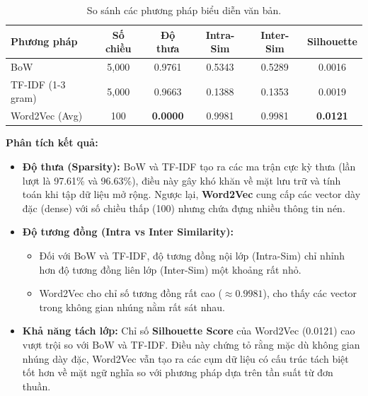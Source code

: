 \documentclass[12pt,a4paper]{article}
\begin{document}
\begin{table}[H]
    \centering
    \caption{So sánh các phương pháp biểu diễn văn bản.}
    \label{tab:vectorization_results}
    \small
    \begin{tabular}{lccccc}
        \toprule
        \textbf{Phương pháp} & \textbf{Số chiều} & \textbf{Độ thưa} & \textbf{Intra-Sim} & \textbf{Inter-Sim} & \textbf{Silhouette} \\
        \midrule
        BoW & 5,000 & 0.9761 & 0.5343 & 0.5289 & 0.0016 \\
        TF-IDF (1-3 gram) & 5,000 & 0.9663 & 0.1388 & 0.1353 & 0.0019 \\
        Word2Vec (Avg) & 100 & \textbf{0.0000} & 0.9981 & 0.9981 & \textbf{0.0121} \\
        \bottomrule
    \end{tabular}
\end{table}

\textbf{Phân tích kết quả:}
\begin{itemize}
    \item \textbf{Độ thưa (Sparsity):} BoW và TF-IDF tạo ra các ma trận cực kỳ thưa (lần lượt là 97.61\% và 96.63\%), điều này gây khó khăn về mặt lưu trữ và tính toán khi tập dữ liệu mở rộng. Ngược lại, \textbf{Word2Vec} cung cấp các vector dày đặc (dense) với số chiều thấp (100) nhưng chứa đựng nhiều thông tin nén.
    \item \textbf{Độ tương đồng (Intra vs Inter Similarity):} 
    \begin{itemize}
        \item Đối với BoW và TF-IDF, độ tương đồng nội lớp (Intra-Sim) chỉ nhỉnh hơn độ tương đồng liên lớp (Inter-Sim) một khoảng rất nhỏ.
        \item Word2Vec cho chỉ số tương đồng rất cao ($\approx 0.9981$), cho thấy các vector trong không gian nhúng nằm rất sát nhau.
    \end{itemize}
    \item \textbf{Khả năng tách lớp:} Chỉ số \textbf{Silhouette Score} của Word2Vec (0.0121) cao vượt trội so với BoW và TF-IDF. Điều này chứng tỏ rằng mặc dù không gian nhúng dày đặc, Word2Vec vẫn tạo ra các cụm dữ liệu có cấu trúc tách biệt tốt hơn về mặt ngữ nghĩa so với phương pháp dựa trên tần suất từ đơn thuần.
\end{itemize}
\end{document}
